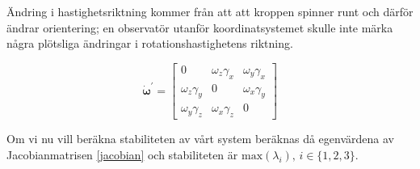 \documentclass[12pt,a4paper]{article}
\begin{document}
		Ändring i hastighetsriktning kommer från att att kroppen spinner runt och därför
		ändrar orientering; en observatör utanför koordinatsystemet skulle inte märka
		några plötsliga ändringar i rotationshastighetens riktning.
		
		\begin{equation}
			\dot{\boldsymbol{\omega}}^{\prime} = \begin{bmatrix}
				0 & \omega_z \gamma_x & \omega_y \gamma_x \\
				\omega_z \gamma_y & 0 & \omega_x \gamma_y \\
				\omega_y \gamma_z & \omega_x \gamma_z & 0
			\end{bmatrix}
			\label{jacobian}
		\end{equation}
		
		Om vi nu vill beräkna stabiliteten av vårt system beräknas då egenvärdena av
		Jacobianmatrisen \eqref{jacobian} och stabiliteten är $\mathrm{max} (\lambda_i),\,i \in \{1,2,3\}$.
		
\end{document}
